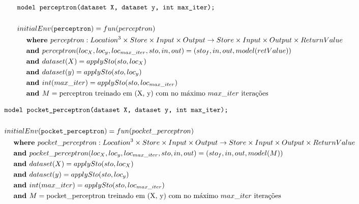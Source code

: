 \documentclass[12pt]{article}
\begin{document}
\begin{align*}
	&\texttt{model perceptron(dataset X, dataset y, int max\_iter);} \\
	\\
&initialEnv(\texttt{perceptron}) = fun(perceptron) \\
&\hspace{3ex}\textbf{where } perceptron:Location^3\times Store\times Input\times Output\rightarrow Store\times Input\times Output\times ReturnValue \\
&\hspace{3ex}\textbf{and } perceptron(loc_{X}, loc_{y}, loc_{max\_iter},sto,in,out) = (sto_f,in,out,model(retValue))\\
&\hspace{3ex}\textbf{and } dataset(X) = applySto(sto, loc_{X}) \\
&\hspace{3ex}\textbf{and } dataset(y) = applySto(sto, loc_{y}) \\
&\hspace{3ex}\textbf{and } int(max\_iter) = applySto(sto, loc_{max\_iter}) \\
&\hspace{3ex}\textbf{and } M = \text{perceptron treinado em (X, y) com no máximo $max\_iter$ iterações}  \\
\end{align*}

\begin{align*}
	&\texttt{model pocket\_perceptron(dataset X, dataset y, int max\_iter);} \\
	\\
&initialEnv(\texttt{pocket\_perceptron}) = fun(pocket\_perceptron) \\
&\hspace{3ex}\textbf{where } pocket\_perceptron:Location^3\times Store\times Input\times Output\rightarrow Store\times Input\times Output\times ReturnValue \\
&\hspace{3ex}\textbf{and } pocket\_perceptron(loc_{X}, loc_{y}, loc_{max\_iter},sto,in,out) = (sto_f,in,out,model(M))\\
&\hspace{3ex}\textbf{and } dataset(X) = applySto(sto, loc_{X}) \\
&\hspace{3ex}\textbf{and } dataset(y) = applySto(sto, loc_{y}) \\
&\hspace{3ex}\textbf{and } int(max\_iter) = applySto(sto, loc_{max\_iter}) \\
&\hspace{3ex}\textbf{and } M = \text{pocket\_perceptron treinado em (X, y) com no máximo $max\_iter$ iterações}  \\
\end{align*}
\end{document}
